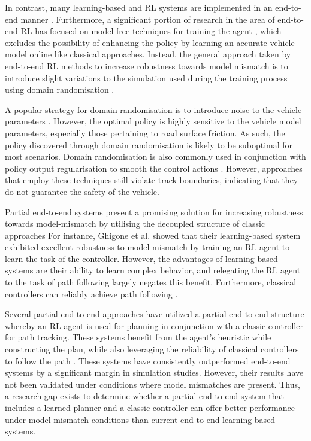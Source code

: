 In contrast, many learning-based and RL systems are implemented in an end-to-end manner \cite{Song2021, Fuchs2021}.
Furthermore, a significant portion of research in the area of end-to-end RL has focused on model-free techniques for training the agent \cite{hsu2022, Chisari2021}, 
which excludes the possibility of enhancing the policy by learning an accurate vehicle model online like classical approaches.
Instead, the general approach taken by end-to-end RL methods to increase robustness towards model mismatch is to 
introduce slight variations to the simulation used during the training process using domain randomisation \cite{Ivanov2020, hsu2022, Chisari2021}.

A popular strategy for domain randomisation is to introduce noise to the vehicle parameters \cite{Chisari2021}. 
However, the optimal policy is highly sensitive to the vehicle model parameters, especially those pertaining to road surface friction. 
As such, the policy discovered through domain randomisation is likely to be suboptimal for most scenarios.
Domain randomisation is also commonly used in conjunction with policy output regularisation to smooth the control actions \cite{hsu2022, Chisari2021}.
However, approaches that employ these techniques \cite{Ivanov2020, hsu2022, Chisari2021} still violate track boundaries, indicating that they do not guarantee the safety of the vehicle.

Partial end-to-end systems present a promising solution for increasing robustness towards model-mismatch by utilising the decoupled structure of classic approaches
For instance, Ghigone et al. \cite{Ghignone2022} showed that their learning-based system exhibited excellent robustness to model-mismatch by training an RL agent to learn the task of the controller. 
However, the advantages of learning-based systems are their ability to learn complex behavior, and relegating the RL agent to the task of path following largely negates this benefit. 
Furthermore, classical controllers can reliably achieve path following \cite{Coulter_1992, Becker2022, Hoffmann2007}.

Several partial end-to-end approaches \cite{Capo2020, Weiss2020, Weiss2020a, Weiss2022} have utilized a partial end-to-end structure whereby an RL agent is used for planning in conjunction with a classic controller for path tracking. 
These systems benefit from the agent's heuristic while constructing the plan, while also leveraging the reliability of classical controllers to follow the path \cite{Betz2021}.
These systems have consistently outperformed end-to-end systems by a significant margin in simulation studies. 
However, their results have not been validated under conditions where model mismatches are present. 
Thus, a research gap exists to determine whether a partial end-to-end system that includes a learned planner and a classic controller can offer better performance under model-mismatch conditions than current end-to-end learning-based systems.

